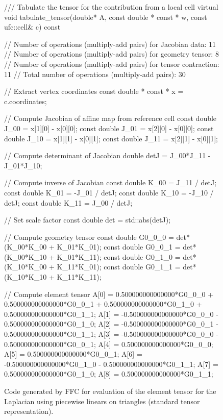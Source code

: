 \begin{figure}
  \scriptsize
  \begin{code}
/// Tabulate the tensor for the contribution from a local cell
virtual void tabulate_tensor(double* A,
                             const double * const * w,
                             const ufc::cell& c) const
{
  // Number of operations (multiply-add pairs) for Jacobian data:      11
  // Number of operations (multiply-add pairs) for geometry tensor:    8
  // Number of operations (multiply-add pairs) for tensor contraction: 11
  // Total number of operations (multiply-add pairs):                  30

  // Extract vertex coordinates
  const double * const * x = c.coordinates;

  // Compute Jacobian of affine map from reference cell
  const double J_00 = x[1][0] - x[0][0];
  const double J_01 = x[2][0] - x[0][0];
  const double J_10 = x[1][1] - x[0][1];
  const double J_11 = x[2][1] - x[0][1];

  // Compute determinant of Jacobian
  double detJ = J_00*J_11 - J_01*J_10;

  // Compute inverse of Jacobian
  const double K_00 =  J_11 / detJ;
  const double K_01 = -J_01 / detJ;
  const double K_10 = -J_10 / detJ;
  const double K_11 =  J_00 / detJ;

  // Set scale factor
  const double det = std::abs(detJ);

  // Compute geometry tensor
  const double G0_0_0 = det*(K_00*K_00 + K_01*K_01);
  const double G0_0_1 = det*(K_00*K_10 + K_01*K_11);
  const double G0_1_0 = det*(K_10*K_00 + K_11*K_01);
  const double G0_1_1 = det*(K_10*K_10 + K_11*K_11);

  // Compute element tensor
  A[0] = 0.500000000000000*G0_0_0 + 0.500000000000000*G0_0_1 +
         0.500000000000000*G0_1_0 + 0.500000000000000*G0_1_1;
  A[1] = -0.500000000000000*G0_0_0 - 0.500000000000000*G0_1_0;
  A[2] = -0.500000000000000*G0_0_1 - 0.500000000000000*G0_1_1;
  A[3] = -0.500000000000000*G0_0_0 - 0.500000000000000*G0_0_1;
  A[4] = 0.500000000000000*G0_0_0;
  A[5] = 0.500000000000000*G0_0_1;
  A[6] = -0.500000000000000*G0_1_0 - 0.500000000000000*G0_1_1;
  A[7] = 0.500000000000000*G0_1_0;
  A[8] = 0.500000000000000*G0_1_1;
}
  \end{code}
  \caption{Code generated by FFC for evaluation of the element tensor
    for the Laplacian using piecewise linears on triangles (standard
    tensor representation).}
  \label{fig:code,poisson}
\end{figure}

